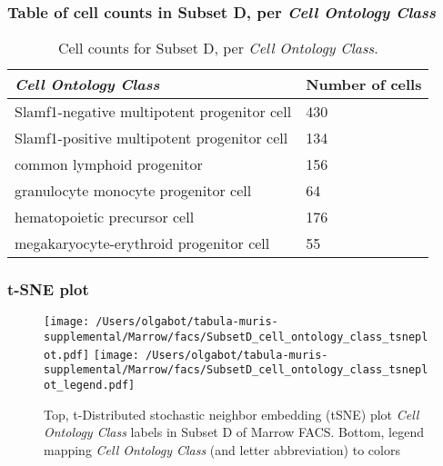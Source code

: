 \subsubsection{Table of cell counts in Subset D, per \emph{Cell Ontology Class}}\begin{table}[h]
\centering
\label{my-label}
\begin{tabular}{@{}ll@{}}
\toprule

\emph{Cell Ontology Class}& Number of cells \\ \midrule
Slamf1-negative multipotent progenitor cell & 430 \\

Slamf1-positive multipotent progenitor cell & 134 \\

common lymphoid progenitor & 156 \\

granulocyte monocyte progenitor cell & 64 \\

hematopoietic precursor cell & 176 \\

megakaryocyte-erythroid progenitor cell & 55 \\
\bottomrule
\end{tabular}
\caption{Cell counts for Subset D, per \emph{Cell Ontology Class}.}
\end{table}

\clearpage
\subsubsection{t-SNE plot}
\begin{figure}[h]
\centering
\texttt{[image: /Users/olgabot/tabula-muris-supplemental/Marrow/facs/SubsetD\_cell\_ontology\_class\_tsneplot.pdf]}
\texttt{[image: /Users/olgabot/tabula-muris-supplemental/Marrow/facs/SubsetD\_cell\_ontology\_class\_tsneplot\_legend.pdf]}
\caption{Top, t-Distributed stochastic neighbor embedding (tSNE) plot  \emph{Cell Ontology Class} labels in Subset D of Marrow FACS. Bottom, legend mapping \emph{Cell Ontology Class} (and letter abbreviation) to colors}
\end{figure}


\clearpage

